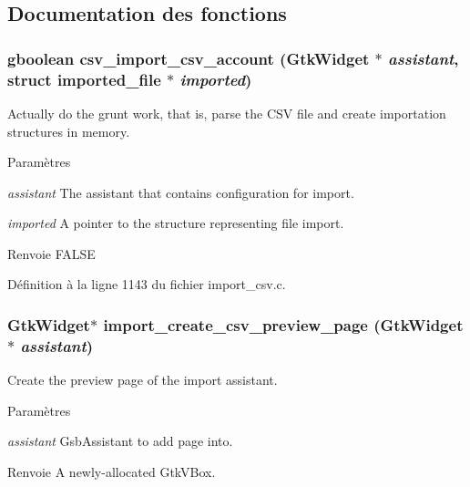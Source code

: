 \subsection{Documentation des fonctions}
\subsubsection[{csv\_\-import\_\-csv\_\-account}]{\setlength{\rightskip}{0pt plus 5cm}gboolean csv\_\-import\_\-csv\_\-account (GtkWidget $\ast$ {\em assistant}, \/  struct {\bf imported\_\-file} $\ast$ {\em imported})}\label{import__csv_8c_ae91b90112538a2ac7605b2843715e3d3}
Actually do the grunt work, that is, parse the CSV file and create importation structures in memory.


\begin{DoxyParams}{Paramètres}
\item[{\em assistant}]The assistant that contains configuration for import. \item[{\em imported}]A pointer to the structure representing file import.\end{DoxyParams}
\begin{DoxyReturn}{Renvoie}
FALSE 
\end{DoxyReturn}


Définition à la ligne 1143 du fichier import\_\-csv.c.

\subsubsection[{import\_\-create\_\-csv\_\-preview\_\-page}]{\setlength{\rightskip}{0pt plus 5cm}GtkWidget$\ast$ import\_\-create\_\-csv\_\-preview\_\-page (GtkWidget $\ast$ {\em assistant})}\label{import__csv_8c_a4539af86cc658258c77621c5e2473d29}
Create the preview page of the import assistant.


\begin{DoxyParams}{Paramètres}
\item[{\em assistant}]GsbAssistant to add page into.\end{DoxyParams}
\begin{DoxyReturn}{Renvoie}
A newly-\/allocated GtkVBox. 
\end{DoxyReturn}


